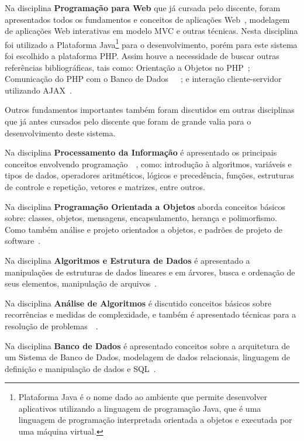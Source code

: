 \documentclass[
  12pt,            %
  openany,
  oneside,
  a4paper,         %
  english,      %
  brazil
]{article}
\numberwithin{figure}{section}
\numberwithin{table}{section}
\begin{document}
Na disciplina \textbf{Programação para Web} que já cursada pelo discente, foram apresentados todos os fundamentos e conceitos de aplicações Web~\cite{pWeb_sebesta}, modelagem de aplicações Web interativas em modelo MVC e outras técnicas. Nesta disciplina foi utilizado a Plataforma Java\footnote{Plataforma Java é o nome dado ao ambiente que permite desenvolver aplicativos utilizando a linguagem de programação Java, que é uma linguagem de programação interpretada orientada a objetos e executada por uma máquina virtual.} para o desenvolvimento, porém para este sistema foi escolhido a plataforma PHP. Assim houve a necessidade de buscar outras referências bibliográficas, tais como: Orientação a Objetos no PHP~\cite{PHP_Novatec_poo}; Comunicação do PHP com o Banco de Dados~\cite{PHP_Novatec_dev}~\cite{PHP_Novatec_appWeb}~\cite{PHP_mysql}; e interação cliente-servidor utilizando AJAX~\cite{PHP_Novatec_ajax}.

Outros fundamentos importantes também foram discutidos em outras disciplinas que já antes cursados pelo discente que foram de grande valia para o desenvolvimento deste sistema.

Na disciplina \textbf{Processamento da Informação} é apresentado os principais conceitos envolvendo programação~\cite{BCC1}~\cite{BCC2}, como: introdução à algoritmos, variáveis e tipos de dados, operadores aritméticos, lógicos e precedência, funções, estruturas de controle e repetição, vetores e matrizes, entre outros.

Na disciplina \textbf{Programação Orientada a Objetos} aborda conceitos básicos sobre: classes, objetos, mensagens, encapsulamento, herança e polimorfismo. Como também análise e projeto orientados a objetos, e padrões de projeto de software~\cite{POO_deitel}.

Na disciplina \textbf{Algoritmos e Estrutura de Dados} é apresentado a manipulações de estruturas de dados lineares e em árvores, busca e ordenação de seus elementos, manipulação de arquivos~\cite{AED_cormen1}.

Na disciplina \textbf{Análise de Algoritmos} é discutido conceitos básicos sobre recorrências e medidas de complexidade, e também é apresentado técnicas para a resolução de problemas~\cite{AED_cormen1}~\cite{AED_cormen2}.

Na disciplina \textbf{Banco de Dados} é apresentado conceitos sobre a arquitetura de um Sistema de Banco de Dados, modelagem de dados relacionais, linguagem de definição e manipulação de dados e SQL~\cite{BD}.
\end{document}
